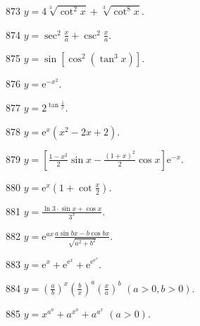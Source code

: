 \begin{prob}[S]{873}
$y = 4\sqrt[3]{\cot^2 x} + \sqrt[3]{\cot^8 x}$.
\end{prob}

\begin{prob}[S]{874}
$y = \sec^2\frac{x}{a} + \csc^2\frac{x}{a}$.
\end{prob}

\begin{prob}[S]{875}
$y = \sin[\cos^2(\tan^3 x)]$.
\end{prob}

\begin{prob}[S]{876}
$y = \mathrm{e}^{-x^2}$.
\end{prob}

\begin{prob}[S]{877}
$y = 2^{\tan\frac{1}{x}}$.
\end{prob}

\begin{prob}[S]{878}
$y = \mathrm{e}^x(x^2 - 2x + 2)$.
\end{prob}

\begin{prob}[S]{879}
$y = \left[\frac{1 - x^2}{2}\sin x - \frac{(1 + x)^2}{2}\cos x\right]\mathrm{e}^{-x}$.
\end{prob}

\begin{prob}[S]{880}
$y = \mathrm{e}^x\left(1 + \cot\frac{x}{2}\right)$.
\end{prob}

\begin{prob}[S]{881}
$y = \frac{\ln 3 \cdot \sin x + \cos x}{3^x}$.
\end{prob}

\begin{prob}[S]{882}
$y = \mathrm{e}^{ax}\frac{a\sin bx - b\cos bx}{\sqrt{a^2 + b^2}}$.
\end{prob}

\begin{prob}[S]{883}
$y = \mathrm{e}^x + \mathrm{e}^{\mathrm{e}^x} + \mathrm{e}^{\mathrm{e}^{\mathrm{e}^x}}$.
\end{prob}

\begin{prob}[S]{884}
$y = \left(\frac{a}{b}\right)^x \left(\frac{b}{x}\right)^a \left(\frac{x}{a}\right)^b$ $(a > 0, b > 0)$.
\end{prob}

\begin{prob}[S]{885}
$y = x^{a^a} + a^{x^a} + a^{a^x}$ $(a > 0)$.
\end{prob}

